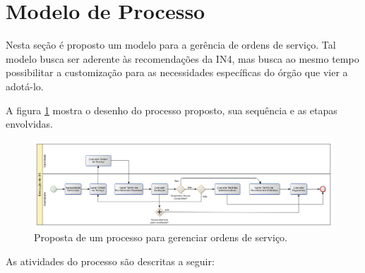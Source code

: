 \section{Modelo de Processo}

Nesta seção é proposto um modelo para a gerência de ordens de serviço. Tal
modelo busca ser aderente às recomendações da IN4, mas busca ao mesmo tempo
possibilitar a customização para as necessidades específicas do órgão que vier
a adotá-lo.

A figura \ref{fig:so_process} mostra o desenho do processo proposto, sua
sequência e as etapas envolvidas.

\begin{figure}[H]
  \centering
  \includegraphics[keepaspectratio=true,scale=0.5]{figures/so_process}
  \caption{Proposta de um processo para gerenciar ordens de serviço.}
  \label{fig:so_process}
\end{figure}

As atividades do processo são descritas a seguir:

